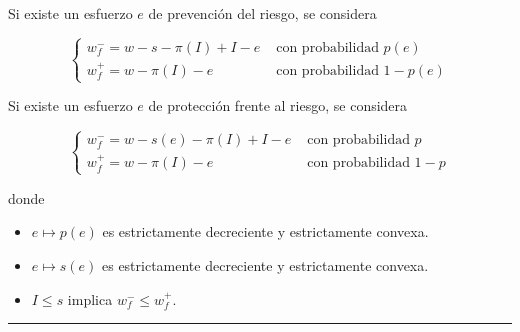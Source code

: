 \begin{f}
	Si existe un esfuerzo \(e\) de prevención del riesgo, se considera
	
	\[
	\begin{cases}
		w_{f}^{-}=w-s-\pi(I)+I-e & \text { con probabilidad } p(e) \\
		w_{f}^{+}=w-\pi(I)-e & \text { con probabilidad } 1-p(e)
	\end{cases}
	\]
	
	Si existe un esfuerzo \(e\) de protección frente al riesgo, se considera
	
	\[
	\begin{cases}
		w_{f}^{-}=w-s(e)-\pi(I)+I-e & \text { con probabilidad } p \\
		w_{f}^{+}=w-\pi(I)-e & \text { con probabilidad } 1-p
	\end{cases}
	\]
	
	donde
	\begin{itemize}
		\item \(e \mapsto p(e)\) es estrictamente decreciente y estrictamente convexa.
		\item \(e \mapsto s(e)\) es estrictamente decreciente y estrictamente convexa.
		\item \(I \leq s\) implica \(w_{f}^{-} \leq w_{f}^{+}\).
	\end{itemize}
	
\end{f}
\hrule

